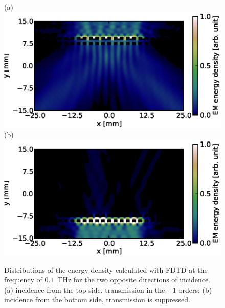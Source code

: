 \documentclass[10pt,letterpaper,twocolumn]{article} %
\begin{document}
\begin{figure}
 \begin{center}
 (a)\includegraphics[width=3.5 in]{fig2a.eps}\\
 \vspace{.3 cm}
 (b)\includegraphics[width=3.5 in]{fig2b.eps}
\end{center}
\caption{Distributions of the energy density calculated with FDTD at the frequency of $0.1$~THz for the two opposite directions of incidence. (a) incidence from the top side, transmission in the $\pm1$ orders; (b) incidence from the bottom side, transmission is suppressed.\label{fig.fdtdfield}}
\end{figure}
\end{document}
